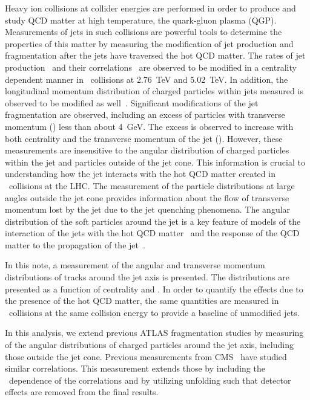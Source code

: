 
Heavy ion collisions at collider energies are performed in order to produce
and study QCD matter at high temperature, the quark-gluon plasma (QGP).  
Measurements of jets in such 
collisions are powerful tools to determine the properties of this matter
by measuring the modification of jet production and fragmentation 
after the jets have traversed the hot QCD matter.
The rates of jet production~\cite{Abelev:2013kqa,Aad:2014bxa,Khachatryan:2016odn} and their correlations~\cite{Aad:2010bu}
are observed to be modified in a centrality dependent manner in \PbPb\ collisions at
2.76~TeV and 5.02~TeV\cite{ATLAS:2017wvp}.
In addition, the longitudinal momentum
 distribution of charged particles within jets measured is observed to be modified as 
well~\cite{Aad:2014wha,Chatrchyan:2014ava, Aaboud:2017bzv,PbPb5TeVIntNote}.
Significant modifications of the jet fragmentation are observed, including an
excess of particles with transverse momentum (\pT) less than about 4~GeV.  The excess
is observed to increase with both centrality and the transverse momentum of the jet (\pTjet).
However, these measurements are insensitive to the angular distribution of charged
particles within the jet and particles outside of the jet cone.  This information
is crucial to understanding how the jet interacts with the hot QCD matter
created in \pbpb\ collisions at the LHC. The measurement of the particle distributions at large angles outside the jet cone provides information about the flow of transverse momentum lost by the jet due to the jet quenching phenomena. The angular distribution of the soft particles around the jet is
a key feature of models of the interaction of the jets with the
hot QCD matter~\cite{Blaizot:2014ula,Brewer:2017fqy} and the
response of the QCD matter to the propagation of the jet~\cite{Tachibana:2017syd,Yan:2017rku}.

In this note, a measurement of the angular and transverse momentum distributions of tracks around the jet
axis is presented.  The distributions are presented as a function of centrality
and \pTjet.  In order to quantify the effects due to the presence of the hot
QCD matter, the same quantities are measured in \pp\ collisions at the same collision 
energy to provide a baseline of unmodified jets.

In this analysis, we extend previous ATLAS fragmentation studies by measuring of the angular distributions of
charged particles around the jet axis, including those outside the jet cone.
Previous measurements from CMS~\cite{Khachatryan:2016tfj,CMSPASHIN16020}
have studied similar correlations.  This measurement extends those
by including the \pTjet\ dependence of the correlations and
by utilizing unfolding such that detector effects are removed from the final results.


